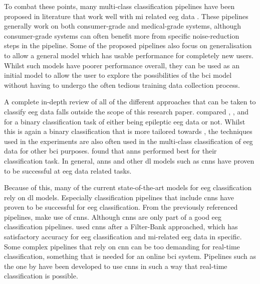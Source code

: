 To combat these points, many multi-class classification pipelines have been proposed in literature that work well with \gls{mi} related \gls{eeg} data \citep{fbcnet, eeg_mi_model_mussi, eeg_mi_model_lda_csp, eeg_mi_model_deep_cnn_spatial_filters, eeg_mi_model_image_based, eeg_model_fbcsp, eeg_model_hbm, eeg_model_esi, eeg_model_eegnet}.
These pipelines generally work on both consumer-grade and medical-grade systems, although consumer-grade systems can often benefit more from specific noise-reduction steps in the pipeline.
Some of the proposed pipelines also focus on generalisation to allow a general model which has usable performance for completely new users.
Whilst such models have poorer performance overall, they can be used as an initial model to allow the user to explore the possibilities of the \gls{bci} model without having to undergo the often tedious training data collection process. 

A complete in-depth review of all of the different approaches that can be taken to classify \gls{eeg} data falls outside the scope of this research paper.
\citet{eeg_analysis_methods_epilepsy_review} compared , ,  and  for a binary classification task of either being epileptic \gls{eeg} data or not.
Whilst this is again a binary classification that is more tailored towards , the techniques used in the experiments are also often used in the multi-class classification of \gls{eeg} data for other \gls{bci} purposes.
 found that \glspl{ann} performed best for their classification task.
In general, \glspl{ann} and other \gls{dl} models such as \glspl{cnn} have proven to be successful at \gls{eeg} data related tasks.

Because of this, many of the current state-of-the-art models for \gls{eeg} classification rely on \gls{dl} models.
Especially classification pipelines that include \glspl{cnn} have proven to be successful for \gls{eeg} classification.
From the previously referenced pipelines, \citet{fbcnet, eeg_mi_model_mussi, eeg_mi_model_deep_cnn_spatial_filters, eeg_model_hbm, eeg_model_esi, eeg_model_eegnet} make use of \glspl{cnn}.
Although \glspl{cnn} are only part of a good \gls{eeg} classification pipelines.
 used \glspl{cnn} after a Filter-Bank approached, which has satisfactory accuracy for \gls{eeg} classification and \gls{mi}-related \gls{eeg} data in specific.
Some complex pipelines that rely on \gls{cnn} can be too demanding for real-time classification, something that is needed for an online \gls{bci} system.
Pipelines such as the one by \citet{eeg_model_eegnet} have been developed to use \glspl{cnn} in such a way that real-time classification is possible.

